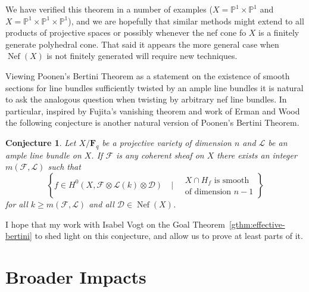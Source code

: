 \documentclass[10pt,reqno]{amsart}
\newtheorem{conj}[lemma]{Conjecture}
\theoremstyle{remark}
\newcommand{\Nef}{\operatorname{Nef}}
\newcommand{\fF}{\mathbf F}
\newcommand{\cD}{\mathcal{D}}
\newcommand{\cF}{\mathcal{F}}
\newcommand{\cL}{\mathcal{L}}
\renewcommand{\P}{\mathbb{P}}
\begin{document}
We have verified this theorem in a number of examples ($X=\P^1\times\P^1$ and $X=\P^1\times\P^1\times\P^1$), and we are hopefully that similar methods might extend to all products of projective spaces or possibly whenever the nef cone fo $X$ is a finitely generate polyhedral cone. That said it appears the more general case when $\Nef(X)$ is not finitely generated will require new techniques. 

Viewing Poonen's Bertini Theorem as a statement on the existence of smooth sections for line bundles sufficiently twisted by an ample line bundles it is natural to ask the analogous question when twisting by arbitrary nef line bundles. In particular, inspired by Fujita's vanishing theorem and work of Erman and Wood the following conjecture is another natural version of Poonen's Bertini Theorem. 

 \begin{conj}
 Let $X/\fF_{q}$ be a projective variety of dimension $n$ and $\cL$ be an ample line bundle on $X$. If $\cF$ is any  coherent sheaf on $X$ there exists an integer $m(\cF,\cL)$ such that 
\begin{equation}
\left\{
f \in H^0\left(X, \cF\otimes\cL(k)\otimes \cD\right) \quad \bigg| \quad 
\begin{matrix}
 \text{$X\cap H_{f}$ is smooth}\\
 \text{of dimension $n-1$}
 \end{matrix}
\right\}
\end{equation}
for all $k\geq m(\cF,\cL)$ and all $\cD\in \Nef(X)$. 
 \end{conj}

I hope that my work with Isabel Vogt on the Goal Theorem~\ref{gthm:effective-bertini} to shed light on this conjecture, and allow us to prove at least parts of it. 


\section{Broader Impacts}
\end{document}
